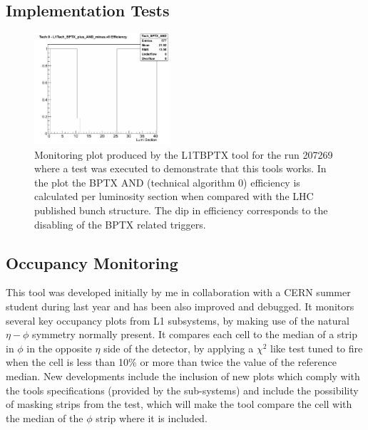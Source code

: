 \subsection{Implementation Tests}


\begin{figure}[!htb]
\centering
\includegraphics[width=0.45\textwidth]{Chapter03/L1TOnline/Images/L1TBPTX_Tech_BPTX_AND.png}
\caption{Monitoring plot produced by the L1TBPTX tool for the run 207269 where a test was executed to demonstrate that 
this tools works. In the plot the BPTX AND (technical algorithm 0) efficiency is calculated per luminosity section 
when compared with the LHC published bunch structure. The dip in efficiency corresponds to the disabling of the BPTX 
related triggers.} 
\label{figure_ServiceWork_L1TBPTX}
\end{figure}

\subsection{Occupancy Monitoring}


This tool was developed initially by me in collaboration with a CERN summer student during last year and has been
also improved and debugged. It monitors several key occupancy plots from L1 subsystems, by making use of the natural
$\eta-\phi$ symmetry normally present. It compares each cell to the median of a strip in $\phi$ in the opposite $\eta$
side of the detector, by applying a $\chi^{2}$ like test tuned to fire when the cell is less than 10\% or more than
twice the value of the reference median. New developments include the inclusion of new plots which comply with the
tools specifications (provided by the sub-systems) and include the possibility of masking strips from the test, which 
will make the tool compare the cell with the median of the $\phi$ strip where it is included.

